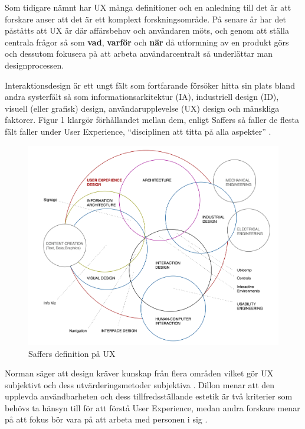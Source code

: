 Som tidigare nämnt har UX många definitioner och en anledning till det är att forskare anser att det är ett komplext forskningsområde\cite{20Mastery}. På senare år har det påståtts att UX är där affärsbehov och användaren möts, och genom att ställa centrala frågor så som \textbf{vad}, \textbf{varför} och \textbf{när} då utformning av en produkt görs och dessutom fokusera på att arbeta användarcentralt så underlättar man designprocessen\cite{20Mastery}. 
\newline

Interaktionsdesign är ett ungt fält som fortfarande försöker hitta sin plats bland andra systerfält så som informationsarkitektur (IA), industriell
design (ID), visuell (eller grafisk) design, användarupplevelse (UX) design och mänskliga faktorer\cite{SafferCreatingDevices}. Figur 1 klargör
förhållandet mellan dem, enligt Saffers så faller de flesta fält faller under User Experience, \enquote{disciplinen att titta på alla aspekter} \cite{SafferCreatingDevices}.

\begin{figure}[H]
  \centering
  \includegraphics[scale=0.45]{ux.jpg}
  \caption{Saffers definition på UX\cite{SafferCreatingDevices}}
\end{figure} 

Norman säger att design kräver kunskap från flera områden vilket gör UX subjektivt och dess utvärderingsmetoder subjektiva \cite{NormanquotPeople}. Dillon menar att den upplevda användbarheten och dess tillfredsställande estetik är två kriterier som behövs ta hänsyn till för att förstå User Experience, medan andra forskare menar på att fokus bör vara på att arbeta med personen i sig \cite{Lee2010UnderstandingUse}. 

